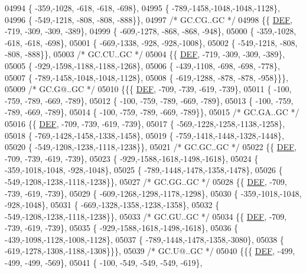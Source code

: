 \begin{DoxyCode}
04994 \{ -359,-1028, -618, -618, -698\},
04995 \{ -789,-1458,-1048,-1048,-1128\},
04996 \{ -549,-1218, -808, -808, -888\}\},
04997 \textcolor{comment}{/* GC.CG..GC */}
04998 \{\{  \mbox{\hyperlink{1_88_84__epars_8h_a397419fc12b37ed479c8abb9d444d843}{DEF}}, -719, -309, -309, -389\},
04999 \{ -609,-1278, -868, -868, -948\},
05000 \{ -359,-1028, -618, -618, -698\},
05001 \{ -669,-1338, -928, -928,-1008\},
05002 \{ -549,-1218, -808, -808, -888\}\},
05003 \textcolor{comment}{/* GC.CU..GC */}
05004 \{\{  \mbox{\hyperlink{1_88_84__epars_8h_a397419fc12b37ed479c8abb9d444d843}{DEF}}, -719, -309, -309, -389\},
05005 \{ -929,-1598,-1188,-1188,-1268\},
05006 \{ -439,-1108, -698, -698, -778\},
05007 \{ -789,-1458,-1048,-1048,-1128\},
05008 \{ -619,-1288, -878, -878, -958\}\}\},
05009 \textcolor{comment}{/* GC.G@..GC */}
05010 \{\{\{  \mbox{\hyperlink{1_88_84__epars_8h_a397419fc12b37ed479c8abb9d444d843}{DEF}}, -709, -739, -619, -739\},
05011 \{ -100, -759, -789, -669, -789\},
05012 \{ -100, -759, -789, -669, -789\},
05013 \{ -100, -759, -789, -669, -789\},
05014 \{ -100, -759, -789, -669, -789\}\},
05015 \textcolor{comment}{/* GC.GA..GC */}
05016 \{\{  \mbox{\hyperlink{1_88_84__epars_8h_a397419fc12b37ed479c8abb9d444d843}{DEF}}, -709, -739, -619, -739\},
05017 \{ -569,-1228,-1258,-1138,-1258\},
05018 \{ -769,-1428,-1458,-1338,-1458\},
05019 \{ -759,-1418,-1448,-1328,-1448\},
05020 \{ -549,-1208,-1238,-1118,-1238\}\},
05021 \textcolor{comment}{/* GC.GC..GC */}
05022 \{\{  \mbox{\hyperlink{1_88_84__epars_8h_a397419fc12b37ed479c8abb9d444d843}{DEF}}, -709, -739, -619, -739\},
05023 \{ -929,-1588,-1618,-1498,-1618\},
05024 \{ -359,-1018,-1048, -928,-1048\},
05025 \{ -789,-1448,-1478,-1358,-1478\},
05026 \{ -549,-1208,-1238,-1118,-1238\}\},
05027 \textcolor{comment}{/* GC.GG..GC */}
05028 \{\{  \mbox{\hyperlink{1_88_84__epars_8h_a397419fc12b37ed479c8abb9d444d843}{DEF}}, -709, -739, -619, -739\},
05029 \{ -609,-1268,-1298,-1178,-1298\},
05030 \{ -359,-1018,-1048, -928,-1048\},
05031 \{ -669,-1328,-1358,-1238,-1358\},
05032 \{ -549,-1208,-1238,-1118,-1238\}\},
05033 \textcolor{comment}{/* GC.GU..GC */}
05034 \{\{  \mbox{\hyperlink{1_88_84__epars_8h_a397419fc12b37ed479c8abb9d444d843}{DEF}}, -709, -739, -619, -739\},
05035 \{ -929,-1588,-1618,-1498,-1618\},
05036 \{ -439,-1098,-1128,-1008,-1128\},
05037 \{ -789,-1448,-1478,-1358,-3080\},
05038 \{ -619,-1278,-1308,-1188,-1308\}\}\},
05039 \textcolor{comment}{/* GC.U@..GC */}
05040 \{\{\{  \mbox{\hyperlink{1_88_84__epars_8h_a397419fc12b37ed479c8abb9d444d843}{DEF}}, -499, -499, -499, -569\},
05041 \{ -100, -549, -549, -549, -619\},

\end{DoxyCode}
